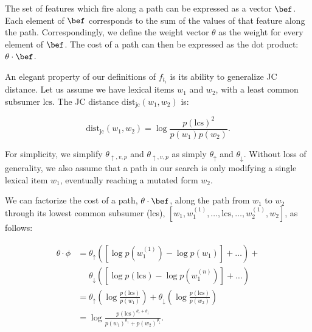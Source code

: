 The set of features which fire along a path
  can be expressed as a vector $\bef$.
Each element of $\bef$ corresponds to the sum of the values of that
  feature along the path.
Correspondingly, we define the weight vector $\theta$ as the
  weight for every element of $\bef$.
The cost of a path can then be expressed as the dot product:
  $\theta \cdot \bef$.

%
%
An elegant property of our definitions of $f_{t_i}$ is its ability to
  generalize JC distance.
Let us assume we have lexical items $w_1$ and $w_2$, with a least common 
  subsumer $\textrm{lcs}$.
The JC distance $\textrm{dist}_{\textrm{jc}}(w_1, w_2)$ is:

\vspace{-0.5em}
\begin{equation}
\textrm{dist}_{\textrm{jc}}(w_1, w_2)
  = \log\frac{p(\textrm{lcs})^2}{p(w_1)p(w_2)}.
\label{eqn:jc}
\end{equation}
\vspace{-0.5em}

For simplicity, we simplify $\theta_{\uparrow,v,p}$ and $\theta_{\uparrow,v,p}$
  as simply $\theta_\uparrow$ and $\theta_\downarrow$.
Without loss of generality, we also assume that a path in our search
  is only modifying a single lexical item $w_1$, eventually 
  reaching a mutated form $w_2$.

We can factorize the cost of a path, $\theta \cdot \bef$, along the path
  from $w_1$ to $w_2$ through its lowest common subsumer (lcs),
  $[w_1, w_1^{(1)}, \dots, \textrm{lcs}, \dots,  w_2^{(1)}, w_2]$,
  as follows:

\vspace{-0.5em}
\begin{align*}
\theta \cdot \phi
  &= \theta_\uparrow \left( 
    \left[\log p(w_1^{(1)}) - \log p(w_1)\right] +
    \dots
    \right) + \\
  &~~~~~~ \theta_\downarrow \left( 
    \left[\log p(\textrm{lcs}) - \log p(w_1^{(n)}) \right] +
    \dots
    \right) \\
  &= \theta_\uparrow \left( \log \frac{p(\textrm{lcs})}{p(w_1)} \right) +
     \theta_\downarrow \left( \log \frac{p(\textrm{lcs})}{p(w_2)} \right) \\
  &= \log \frac{ p(\textrm{lcs})^{\theta_\uparrow + \theta_\downarrow} }
               { p(w_1)^{\theta_\uparrow} + p(w_2)^{\theta_\downarrow} }.
\end{align*}
\vspace{-0.5em}

